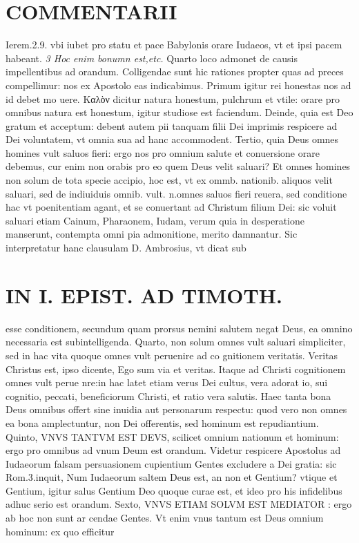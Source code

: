 \documentclass{article}
\begin{document}
\begin{pages}
\section*{COMMENTARII }
\marginpar{[ p.48 ]}\pstart Ierem.2.9. vbi iubet pro statu et pace Babylonis orare Iudaeos, vt et ipsi pacem habeant.  \pend
\textit{3 Hoc enim bonumn est,etc. }\pstart Quarto loco admonet de causis impellentibus ad orandum. Colligendae sunt hic rationes propter quas ad preces compellimur: nos ex Apostolo eas indicabimus. Primum igitur rei honestas nos ad id debet mo uere. Καλὸν dicitur natura honestum, pulchrum et vtile: orare pro omnibus natura est honestum, igitur studiose est faciendum. Deinde, quia est Deo gratum et acceptum: debent autem pii tanquam filii Dei imprimis respicere ad Dei voluntatem, vt omnia sua ad hanc accommodent. Tertio, quia Deus omnes homines vult saluos fieri: ergo nos pro omnium salute et conuersione orare debemus, cur enim non orabis pro eo quem Deus velit saluari? Et omnes homines non solum de tota specie accipio, hoc est, vt ex ommb. nationib. aliquos velit saluari, sed de indiuiduis omnib. vult. n.omnes saluos fieri reuera, sed conditione hac vt poenitentiam agant, et se conuertant ad Christum filium Dei: sic voluit saluari etiam Cainum, Pharaonem, Iudam, verum quia in desperatione manserunt, contempta omni pia admonitione, merito damnantur. Sic interpretatur hanc clausulam D. Ambrosius, vt dicat sub\pend
\section*{IN I. EPIST. AD TIMOTH. }
\marginpar{[ p.49 ]}\pstart esse conditionem, secundum quam prorsus nemini salutem negat Deus, ea omnino necessaria est subintelligenda. Quarto, non solum omnes vult saluari simpliciter, sed in hac vita quoque omnes vult peruenire ad co gnitionem veritatis. Veritas Christus est, ipso dicente, Ego sum via et veritas. Itaque ad Christi cognitionem omnes vult perue nre:in hac latet etiam verus Dei cultus, vera adorat io, sui cognitio, peccati, beneficiorum Christi, et ratio vera salutis. Haec tanta bona Deus omnibus offert sine inuidia aut personarum respectu: quod vero non omnes ea bona amplectuntur, non Dei offerentis, sed hominum est repudiantium.  \pend\pstart Quinto, VNVS TANTVM EST DEVS, scilicet omnium nationum et hominum: ergo pro omnibus ad vnum Deum est orandum. Videtur respicere Apostolus ad Iudaeorum falsam persuasionem cupientium Gentes excludere a Dei gratia: sic Rom.3.inquit, Num Iudaeorum saltem Deus est, an non et Gentium? vtique et Gentium, igitur salus Gentium Deo quoque curae est, et ideo pro his infidelibus adhuc serio est orandum. Sexto, VNVS ETIAM SOLVM EST MEDIATOR : ergo ab hoc non sunt ar cendae Gentes. Vt enim vnus tantum est Deus omnium hominum: ex quo efficitur  \pend

\end{pages}
\end{document}
